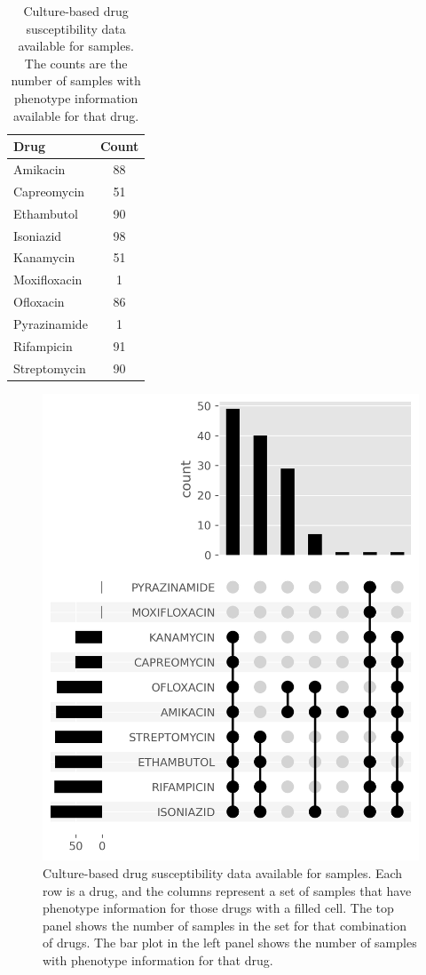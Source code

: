 \begin{table}
\centering
\begin{tabular}{|l|c|}
\hline
Drug         & Count \\ \hline
Amikacin     & 88    \\ \hline
Capreomycin  & 51    \\ \hline
Ethambutol   & 90    \\ \hline
Isoniazid    & 98    \\ \hline
Kanamycin    & 51    \\ \hline
Moxifloxacin & 1     \\ \hline
Ofloxacin    & 86    \\ \hline
Pyrazinamide & 1     \\ \hline
Rifampicin   & 91    \\ \hline
Streptomycin & 90    \\ \hline
\end{tabular}
\caption{Culture-based drug susceptibility data available for samples. The counts are the number of samples with phenotype information available for that drug.}
\label{tab:available-dst}
\end{table}

\begin{figure}
\begin{center}
\includegraphics[width=0.90\columnwidth]{Chapter3/Figs/available_dst.png}
\caption{{Culture-based drug susceptibility data available for samples. Each row is a drug, and the columns represent a set of samples that have phenotype information for those drugs with a filled cell. The top panel shows the number of samples in the set for that combination of drugs. The bar plot in the left panel shows the number of samples with phenotype information for that drug.
{\label{fig:available-dst}}
}}
\end{center}
\end{figure}
